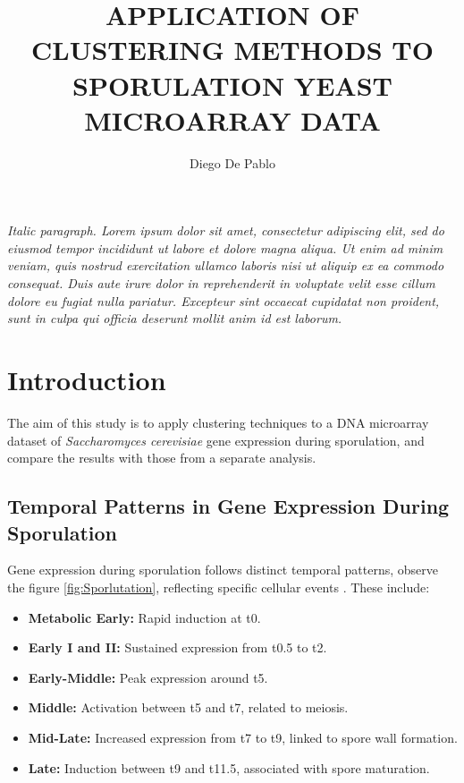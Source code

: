 \documentclass{llncs}
\begin{document}
\title{APPLICATION OF CLUSTERING METHODS TO
	SPORULATION YEAST MICROARRAY DATA}

\author{Diego De Pablo}

\maketitle 

\vspace{1cm} %

\textit{Italic paragraph. Lorem ipsum dolor sit amet, consectetur adipiscing elit, sed do eiusmod tempor incididunt ut labore et dolore magna aliqua. Ut enim ad minim veniam, quis nostrud exercitation ullamco laboris nisi ut aliquip ex ea commodo consequat. Duis aute irure dolor in reprehenderit in voluptate velit esse cillum dolore eu fugiat nulla pariatur. Excepteur sint occaecat cupidatat non proident, sunt in culpa qui officia deserunt mollit anim id est laborum.}



\section{Introduction}


The aim of this study is to apply clustering techniques to a DNA microarray dataset of \textit{Saccharomyces cerevisiae} gene expression during sporulation, and compare the results with those from a separate analysis.


\subsection*{Temporal Patterns in Gene Expression During Sporulation}

Gene expression during sporulation follows distinct temporal patterns, observe the figure \ref{fig:Sporlutation}, reflecting specific cellular events \cite{chu1998}. These include:
\begin{itemize}
	\item \textbf{Metabolic Early:} Rapid induction at t0.
	\item \textbf{Early I and II:} Sustained expression from t0.5 to t2.
	\item \textbf{Early-Middle:} Peak expression around t5.
	\item \textbf{Middle:} Activation between t5 and t7, related to meiosis.
	\item \textbf{Mid-Late:} Increased expression from t7 to t9, linked to spore wall formation.
	\item \textbf{Late:} Induction between t9 and t11.5, associated with spore maturation.
\end{itemize}
\end{document}
